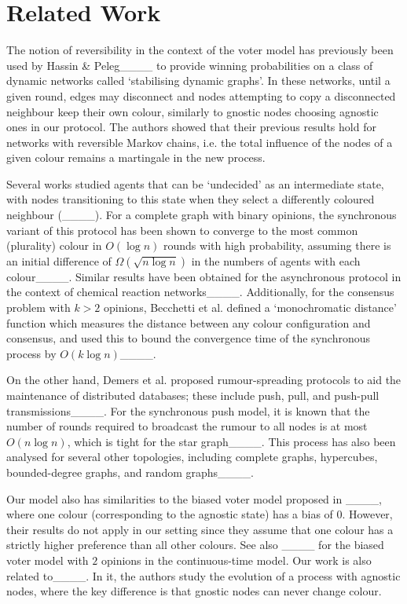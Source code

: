 \section{Related Work}
\label{sec:related_work}

The notion of reversibility in the context of the voter model has previously been used by Hassin \& Peleg____ to provide winning probabilities on a class of dynamic networks called `stabilising dynamic graphs'. 
In these networks, until a given round, edges may disconnect and nodes attempting to copy a disconnected neighbour keep their own colour, similarly to gnostic nodes choosing agnostic ones in our protocol. 
The authors showed that their previous results hold for networks with reversible Markov chains, i.e. the total influence of the nodes of a given colour remains a martingale in the new process.

Several works studied agents that can be `undecided' as an intermediate state, with nodes transitioning to this state when they select a differently coloured neighbour (____). For a complete graph with binary opinions, the synchronous variant of this protocol has been shown to converge to the most common (plurality) colour in $O(\log n)$ rounds with high probability, assuming there is an initial difference of $\Omega(\sqrt{n \log n})$ in the numbers of agents with each colour____. Similar results have been obtained for the asynchronous protocol in the context of chemical reaction networks____. Additionally, for the consensus problem with $k>2$ opinions, Becchetti et al. defined a `monochromatic distance' function which measures the distance between any colour configuration and consensus, and used this to bound the convergence time of the synchronous process by $O(k \log n)$____. 

On the other hand, Demers et al. proposed rumour-spreading protocols to aid the maintenance of distributed databases; these include push, pull, and push-pull transmissions____. For the synchronous push model, it is known that the number of rounds required to broadcast the rumour to all nodes is at most $O(n \log n)$, which is tight for the star graph____. This process has also been analysed for several other topologies, including complete graphs, hypercubes, bounded-degree graphs, and random graphs____.

Our model also has similarities to the biased voter model proposed in ____, where one colour (corresponding to the agnostic state) has a bias of $0$. However, their results do not apply in our setting since they assume that one colour has a strictly higher preference than all other colours. See also ____ for the biased voter model with $2$ opinions in the continuous-time model. Our work is also related to____. In it, the authors study the evolution of a process with agnostic nodes, where the key difference is that gnostic nodes can never change colour. 

